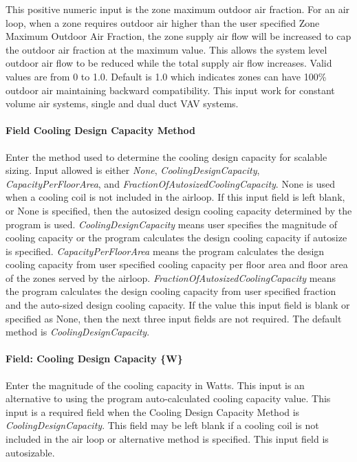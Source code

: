 This positive numeric input is the zone maximum outdoor air fraction. For an air loop, when a zone requires outdoor air higher than the user specified Zone Maximum Outdoor Air Fraction, the zone supply air flow will be increased to cap the outdoor air fraction at the maximum value. This allows the system level outdoor air flow to be reduced while the total supply air flow increases. Valid values are from 0 to 1.0. Default is 1.0 which indicates zones can have 100\% outdoor air maintaining backward compatibility. This input work for constant volume air systems, single and dual duct VAV systems.

\paragraph{Field Cooling Design Capacity Method}\label{field-cooling-design-capacity-method-1}

Enter the method used to determine the cooling design capacity for scalable sizing. Input allowed is either \emph{None}, \emph{CoolingDesignCapacity}, \emph{CapacityPerFloorArea}, and \emph{FractionOfAutosizedCoolingCapacity}. None is used when a cooling coil is not included in the airloop. If this input field is left blank, or None is specified, then the autosized design cooling capacity determined by the program is used. \emph{CoolingDesignCapacity} means user specifies the magnitude of cooling capacity or the program calculates the design cooling capacity if autosize is specified. \emph{CapacityPerFloorArea} means the program calculates the design cooling capacity from user specified cooling capacity per floor area and floor area of the zones served by the airloop. \emph{FractionOfAutosizedCoolingCapacity} means the program calculates the design cooling capacity from user specified fraction and the auto-sized design cooling capacity. If the value this input field is blank or specified as None, then the next three input fields are not required. The default method is \emph{CoolingDesignCapacity}.

\paragraph{Field: Cooling Design Capacity \{W\}}\label{field-cooling-design-capacity-w-1}

Enter the magnitude of the cooling capacity in Watts. This input is an alternative to using the program auto-calculated cooling capacity value. This input is a required field when the Cooling Design Capacity Method is \emph{CoolingDesignCapacity}. This field may be left blank if a cooling coil is not included in the air loop or alternative method is specified. This input field is autosizable.

